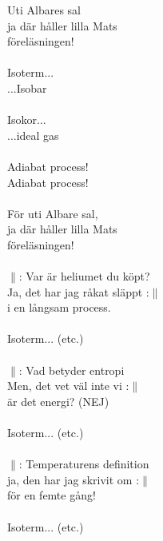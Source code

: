 \documentclass[a6paper, 10pt, twoside]{article}
\begin{document}
\begin{center}
\end{center}
\begin{lyrics}
Uti Albares sal\\
ja där håller lilla Mats\\
föreläsningen!\\
\\
Isoterm...\\
...Isobar\\
\\
Isokor...\\
...ideal gas\\
\\
Adiabat process!\\
Adiabat process!\\
\\
För uti Albare sal, \\
ja där håller lilla Mats\\
föreläsningen!\\
\\
$\|$: Var är heliumet du köpt?\\
Ja, det har jag råkat släppt :$\|$\\
i en långsam process.\\
\\
Isoterm... (etc.)\\
\\
$\|$: Vad betyder entropi\\
Men, det vet väl inte vi :$\|$\\
är det energi? (NEJ)\\
\\
Isoterm... (etc.)\\
\\
$\|$: Temperaturens definition\\
ja, den har jag skrivit om :$\|$ \\
för en femte gång!\\
\\
Isoterm... (etc.)
\end{lyrics}
\end{document}
